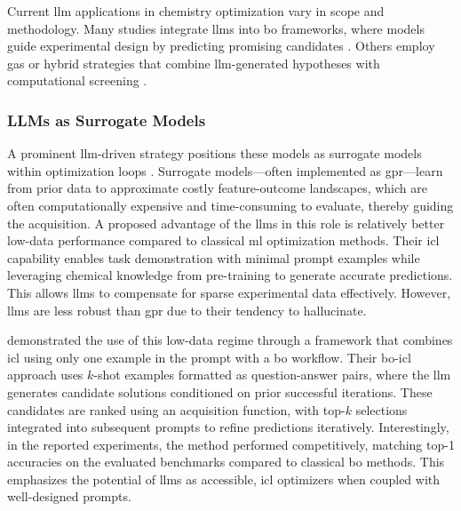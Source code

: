 Current \gls{llm} applications in chemistry optimization vary in scope and methodology. 
Many studies integrate \glspl{llm} into \gls{bo} frameworks, where models guide experimental design by predicting promising candidates \autocite{rankovic2023bochemian}. Others employ \glspl{ga} or hybrid strategies that combine \gls{llm}-generated hypotheses with computational screening \autocite{cisse2025language0based}.  

\subsubsection{LLMs as Surrogate Models}

A prominent \gls{llm}-driven strategy positions these models as surrogate models within optimization loops \autocite{yu2025collaborative}. 
Surrogate models---often implemented as \gls{gpr}---learn from prior data to approximate costly feature-outcome landscapes, which are often computationally expensive and time-consuming to evaluate, thereby guiding the acquisition.
A proposed advantage of the \glspl{llm} in this role is relatively better low-data performance compared to classical \gls{ml} optimization methods.
Their \gls{icl} capability enables task demonstration with minimal prompt examples while leveraging chemical knowledge from pre-training to generate accurate predictions. 
This allows \glspl{llm} to compensate for sparse experimental data effectively. 
However, \glspl{llm} are less robust than \gls{gpr} due to their tendency to hallucinate.

\textcite{ramos2023bayesian} demonstrated the use of this low-data regime through a framework that combines \gls{icl} using only one example in the prompt with a \gls{bo} workflow. 
Their \gls{bo}-\gls{icl} approach uses $k$-shot examples formatted as question-answer pairs, where the \gls{llm} generates candidate solutions conditioned on prior successful iterations. 
These candidates are ranked using an acquisition function, with top-$k$ selections integrated into subsequent prompts to refine predictions iteratively. 
Interestingly, in the reported experiments, the method performed competitively, matching top-1 accuracies on the evaluated benchmarks compared to classical \gls{bo} methods. This emphasizes the potential of \glspl{llm} as accessible, \gls{icl} optimizers when coupled with well-designed prompts.

